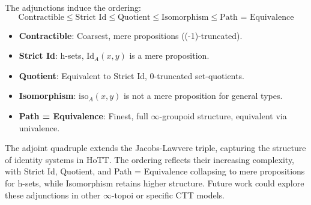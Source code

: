 \documentclass{article}
\begin{document}
The adjunctions induce the ordering:
\[
\text{Contractible} \leq \text{Strict Id} \leq \text{Quotient} \leq \text{Isomorphism} \leq \text{Path = Equivalence}
\]
\begin{itemize}
    \item \textbf{Contractible}: Coarsest, mere propositions ((-1)-truncated).
    \item \textbf{Strict Id}: h-sets, $\text{Id}_A(x,y)$ is a mere proposition.
    \item \textbf{Quotient}: Equivalent to Strict Id, 0-truncated set-quotients.
    \item \textbf{Isomorphism}: $\text{iso}_A(x,y)$ is not a mere proposition for general types.
    \item \textbf{Path = Equivalence}: Finest, full $\infty$-groupoid structure, equivalent via univalence.
\end{itemize}

The adjoint quadruple extends the Jacobs-Lawvere triple, capturing the structure of identity systems in HoTT. The ordering reflects their increasing complexity, with Strict Id, Quotient, and Path = Equivalence collapsing to mere propositions for h-sets, while Isomorphism retains higher structure. Future work could explore these adjunctions in other $\infty$-topoi or specific CTT models.
\end{document}
